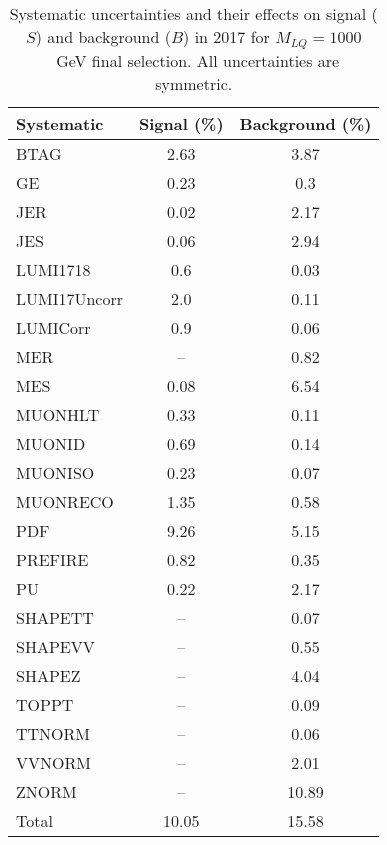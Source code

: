 \begin{table}[htbp]
\begin{center}
\caption{Systematic uncertainties and their effects on signal ($S$) and background ($B$) in 2017 for $M_{LQ}=1000$~GeV final selection. All uncertainties are symmetric.}
\begin{tabular}{lcc}
\hline\hline
Systematic & Signal (\%) & Background (\%) \\ \hline 
BTAG & 2.63 & 3.87\\ 
GE & 0.23 & 0.3\\ 
JER & 0.02 & 2.17\\ 
JES & 0.06 & 2.94\\ 
LUMI1718 & 0.6 & 0.03\\ 
LUMI17Uncorr & 2.0 & 0.11\\ 
LUMICorr & 0.9 & 0.06\\ 
MER & -- & 0.82\\ 
MES & 0.08 & 6.54\\ 
MUONHLT & 0.33 & 0.11\\ 
MUONID & 0.69 & 0.14\\ 
MUONISO & 0.23 & 0.07\\ 
MUONRECO & 1.35 & 0.58\\ 
PDF & 9.26 & 5.15\\ 
PREFIRE & 0.82 & 0.35\\ 
PU & 0.22 & 2.17\\ 
SHAPETT & -- & 0.07\\ 
SHAPEVV & -- & 0.55\\ 
SHAPEZ & -- & 4.04\\ 
TOPPT & -- & 0.09\\ 
TTNORM & -- & 0.06\\ 
VVNORM & -- & 2.01\\ 
ZNORM & -- & 10.89\\ 
Total & 10.05 & 15.58\\ \hline \hline
\end{tabular}
\label{tab:SysUncertainties_uujj_1000}
\end{center}
\end{table}

